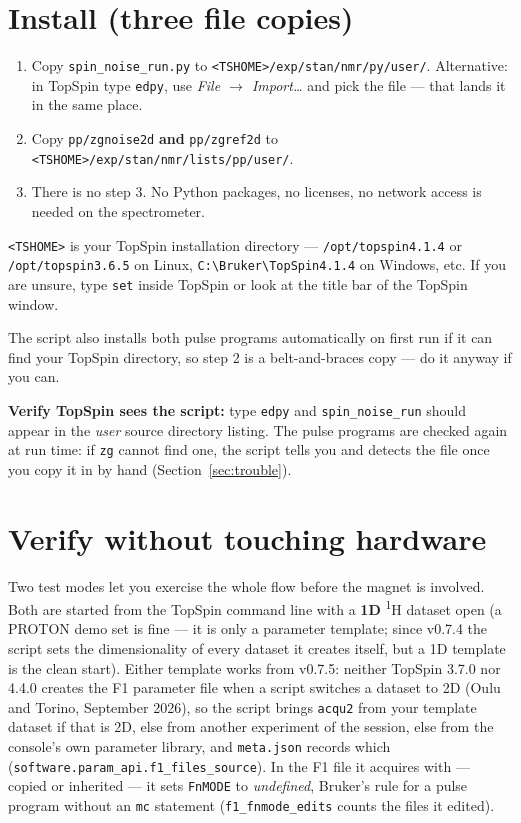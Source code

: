 \documentclass[11pt]{article}
\newcommand{\hnmr}{\textsuperscript{1}H}
\newcommand{\ts}{TopSpin}
\newcommand{\file}[1]{\texttt{#1}}
\begin{document}
\section{Install (three file copies)}

\begin{enumerate}
\item Copy \file{spin\_noise\_run.py} to
      \file{<TSHOME>/exp/stan/nmr/py/user/}.
      Alternative: in \ts{} type \texttt{edpy}, use \emph{File
      $\rightarrow$ Import\ldots} and pick the file --- that lands it in the
      same place.
\item Copy \file{pp/zgnoise2d} \textbf{and} \file{pp/zgref2d} to
      \file{<TSHOME>/exp/stan/nmr/lists/pp/user/}.
\item There is no step 3. No Python packages, no licenses, no network access
      is needed on the spectrometer.
\end{enumerate}

\file{<TSHOME>} is your \ts{} installation directory ---
\file{/opt/topspin4.1.4} or \file{/opt/topspin3.6.5} on Linux,
\file{C:\textbackslash Bruker\textbackslash TopSpin4.1.4} on Windows, etc.
If you are unsure, type \texttt{set} inside \ts{} or look at the title bar of
the \ts{} window.

The script also installs both pulse programs automatically on first run if
it can find your \ts{} directory, so step 2 is a belt-and-braces copy --- do
it anyway if you can.

\textbf{Verify \ts{} sees the script:} type \texttt{edpy} and
\file{spin\_noise\_run} should appear in the \emph{user} source directory
listing. The pulse programs are checked again at run time: if \texttt{zg}
cannot find one, the script tells you and detects the file once you copy it
in by hand (Section~\ref{sec:trouble}).

\section{Verify without touching hardware}
\label{sec:verify}

Two test modes let you exercise the whole flow before the magnet is involved.
Both are started from the \ts{} command line with a \textbf{1D} \hnmr{} dataset
open (a PROTON demo set is fine --- it is only a parameter template; since
v0.7.4 the script sets the dimensionality of every dataset it creates itself,
but a 1D template is the clean start). Either template works from v0.7.5:
neither \ts{} 3.7.0 nor 4.4.0 creates the F1 parameter file when a script
switches a dataset to 2D (Oulu and Torino, September 2026), so the script
brings \file{acqu2} from your template dataset if that is 2D, else from
another experiment of the session, else from the console's own parameter
library, and \file{meta.json} records which
(\texttt{software.param\_api.f1\_files\_source}). In the F1 file it
acquires with --- copied or inherited --- it sets \texttt{FnMODE} to
\emph{undefined}, Bruker's rule for a pulse program without an \texttt{mc}
statement (\texttt{f1\_fnmode\_edits} counts the files it edited).
\end{document}
